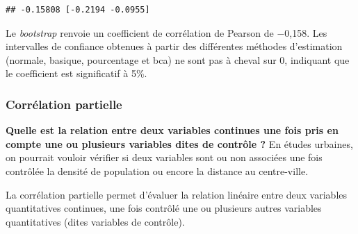 \documentclass[
  11pt,
  french,
]{book}
\makeatletter
\newenvironment{Shaded}{\begin{snugshade}}{\end{snugshade}}
\newcommand{\CommentTok}[1]{\textcolor[rgb]{0.56,0.35,0.01}{\textit{#1}}}
\newcommand{\DataTypeTok}[1]{\textcolor[rgb]{0.13,0.29,0.53}{#1}}
\newcommand{\DecValTok}[1]{\textcolor[rgb]{0.00,0.00,0.81}{#1}}
\newcommand{\KeywordTok}[1]{\textcolor[rgb]{0.13,0.29,0.53}{\textbf{#1}}}
\newcommand{\NormalTok}[1]{#1}
\newcommand{\OperatorTok}[1]{\textcolor[rgb]{0.81,0.36,0.00}{\textbf{#1}}}
\newcommand{\StringTok}[1]{\textcolor[rgb]{0.31,0.60,0.02}{#1}}
\newenvironment{kframe}{%
\medskip{}
\setlength{\fboxsep}{.8em}
 \def\at@end@of@kframe{}%
 \ifinner\ifhmode%
  \def\at@end@of@kframe{\end{minipage}}%
  \begin{minipage}{\columnwidth}%
 \fi\fi%
 \def\FrameCommand##1{\hskip\@totalleftmargin \hskip-\fboxsep
 \colorbox{shadecolor}{##1}\hskip-\fboxsep
     \hskip-\linewidth \hskip-\@totalleftmargin \hskip\columnwidth}%
 \MakeFramed {\advance\hsize-\width
   \@totalleftmargin\z@ \linewidth\hsize
   \@setminipage}}%
 {\par\unskip\endMakeFramed%
 \at@end@of@kframe}
\newenvironment{kframev}{%
\medskip{}
\setlength{\fboxsep}{.8em}
 \def\at@end@of@kframev{}%
 \ifinner\ifhmode%
  \def\at@end@of@kframev{\end{minipage}}%
  \begin{minipage}{\columnwidth}%
 \fi\fi%
 \def\FrameCommand##1{\hskip\@totalleftmargin \hskip-\fboxsep
 \colorbox{shadebluecolor}{##1}\hskip-\fboxsep
     \hskip-\linewidth \hskip-\@totalleftmargin \hskip\columnwidth}%
 \MakeFramed {\advance\hsize-\width
   \@totalleftmargin\z@ \linewidth\hsize
   \@setminipage}}%
 {\par\unskip\endMakeFramed%
 \at@end@of@kframev}
\renewenvironment{Shaded}{\begin{kframe}}{\end{kframe}}
\newenvironment{rmdblock}[1]
  {
  \begin{itemize}
  \renewcommand{\labelitemi}{
    \raisebox{-.7\height}[0pt][0pt]{
      {\setkeys{Gin}{width=3em,keepaspectratio}\texttt{[image: images/\#1]}}
    }
  }
  \setlength{\fboxsep}{1em}
  \begin{kframev}
  \small
  \item
  }
  {
  \end{kframev}
  \end{itemize}
  }
\newenvironment{bloc_objectif}
  {\begin{rmdblock}{objectif}}
  {\end{rmdblock}}
\makeatother
\begin{document}
\begin{Shaded}
\end{Shaded}

\begin{verbatim}
## -0.15808 [-0.2194 -0.0955]
\end{verbatim}

Le \emph{bootstrap} renvoie un coefficient de corrélation de Pearson de −0,158. Les intervalles de confiance obtenues à partir des différentes méthodes d'estimation (normale, basique, pourcentage et bca) ne sont pas à cheval sur 0, indiquant que le coefficient est significatif à 5\%.

\hypertarget{sect04136}{%
\subsubsection{Corrélation partielle}\label{sect04136}}

\begin{bloc_objectif}

\textbf{Quelle est la relation entre deux variables continues une fois pris en compte une ou plusieurs variables dites de contrôle ?} En études urbaines, on pourrait vouloir vérifier si deux variables sont ou non associées une fois contrôlée la densité de population ou encore la distance au centre-ville.

La corrélation partielle permet d'évaluer la relation linéaire entre deux variables quantitatives continues, une fois contrôlé une ou plusieurs autres variables quantitatives (dites variables de contrôle).

\end{bloc_objectif}
\end{document}

